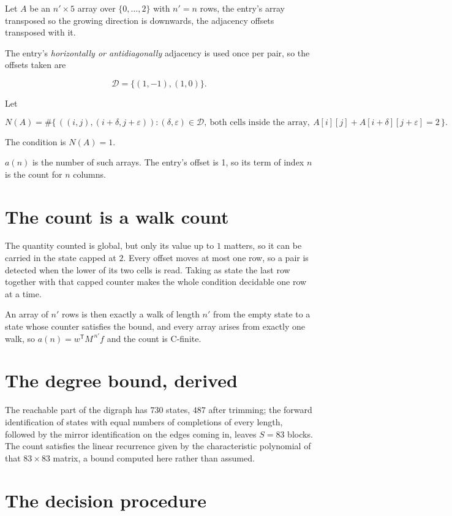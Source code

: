 \documentclass[11pt]{article}
\theoremstyle{definition}
\begin{document}
Let $A$ be an $n' \times 5$ array over $\{0,\dots,2\}$ with $n' = n$ rows, the entry's array transposed so the growing direction is downwards, the adjacency offsets transposed with it.

The entry's {\itshape horizontally or antidiagonally} adjacency is used once per pair, so the offsets taken are

\[\mathcal{D} = \{(1,-1), (1,0)\}.\]

Let

\[N(A) = \#\bigl\{\,((i,j),(i{+}\delta,j{+}\varepsilon)) : (\delta,\varepsilon) \in \mathcal{D},\ \text{both cells inside the array},\ A[i][j] + A[i{+}\delta][j{+}\varepsilon] = 2\,\bigr\}.\]

The condition is $N(A) = 1$.

$a(n)$ is the number of such arrays. The entry's offset is 1, so its term of index $n$ is the count for $n$ columns.

\section{The count is a walk count}

The quantity counted is global, but only its value up to $1$ matters, so it can be carried in the state capped at $2$. Every offset moves at most one row, so a pair is detected when the lower of its two cells is read. Taking as state the last row together with that capped counter makes the whole condition decidable one row at a time.

An array of $n'$ rows is then exactly a walk of length $n'$ from the empty state to a state whose counter satisfies the bound, and every array arises from exactly one walk, so $a(n) = w^{\mathsf T}M^{\,n'}f$ and the count is C-finite.

\section{The degree bound, derived}

The reachable part of the digraph has $730$ states, $487$ after trimming; the forward identification of states with equal numbers of completions of every length, followed by the mirror identification on the edges coming in, leaves $S = 83$ blocks. The count satisfies the linear recurrence given by the characteristic polynomial of that $83\times83$ matrix, a bound computed here rather than assumed.

\section{The decision procedure}
\end{document}
